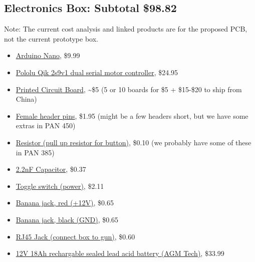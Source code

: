 \documentclass[letterpaper,12pt]{article}
\begin{document}
\subsection{Electronics Box: Subtotal \$98.82}
Note: The current cost analysis and linked products are for the proposed PCB, not the current prototype box.
\begin{itemize}
\item{\href{https://www.amazon.com/gp/product/B01983R7PK/ref=oh_aui_detailpage_o03_s00?ie=UTF8&psc=1}{Arduino Nano}, \$9.99
}
\item{\href{https://www.pololu.com/product/1110}{Pololu Qik 2s9v1 dual serial motor controller}, \$24.95
}
\item{\href{https://www.pcbgogo.com/orderonline.aspx}{Printed Circuit Board}, \textasciitilde\$5 (5 or 10 boards for \$5 + \$15-\$20 to ship from China)
}
\item{\href{https://www.digikey.com/product-detail/en/adafruit-industries-llc/85/1528-1074-ND/5154649?WT.srch=1&gclid=EAIaIQobChMItfGY14iD2QIVRJ7ACh3RtgqiEAYYAyABEgJZSvD_BwE}{Female header pins}, \$1.95 (might be a few headers short, but we have some extras in PAN 450)
}
\item{\href{https://www.digikey.com/product-detail/en/stackpole-electronics-inc/RNMF14FTC6K20/S6.2KCACT-ND/2617529}{Resistor (pull up resistor for button)}, \$0.10 (we probably have some of these in PAN 385)
}
\item{\href{https://www.digikey.com/product-detail/en/tdk-corporation/CK45-B3AD222KYNNA/445-16006-ND/4457608}{2.2nF Capacitor}, \$0.37
}
\item{\href{https://www.digikey.com/product-detail/en/e-switch/100SP1T1B1M1QEH/EG2350-ND/378819}{Toggle switch (power)}, \$2.11
}
\item{\href{https://www.digikey.com/product-detail/en/cinch-connectivity-solutions-johnson/108-0902-001/J151-ND/5929}{Banana jack, red (+12V)}, \$0.65
}
\item{\href{https://www.digikey.com/product-detail/en/cinch-connectivity-solutions-johnson/108-0903-001/J152-ND/5930}{Banana jack, black (GND)}, \$0.65
}
\item{\href{https://www.digikey.com/product-detail/en/amphenol-fci/54602-908LF/609-1046-ND/1001360}{RJ45 Jack (connect box to gun)}, \$0.60
}
\item{\href{https://www.amazon.com/ExpertPower-EXP12180-Rechargeable-Battery-Bolts/dp/B00A82A3RK/ref=pd_rhf_dp_s_cp_0_1?_encoding=UTF8&pd_rd_i=B00A82A3RK&pd_rd_r=AV6KKGY30GWW44717RG1&pd_rd_w=rgVh3&pd_rd_wg=pwAHe&refRID=AV6KKGY30GWW44717RG1&th=1}{12V 18Ah rechargable sealed lead acid battery (AGM Tech)}, \$33.99
}
\end{itemize}
\end{document}
